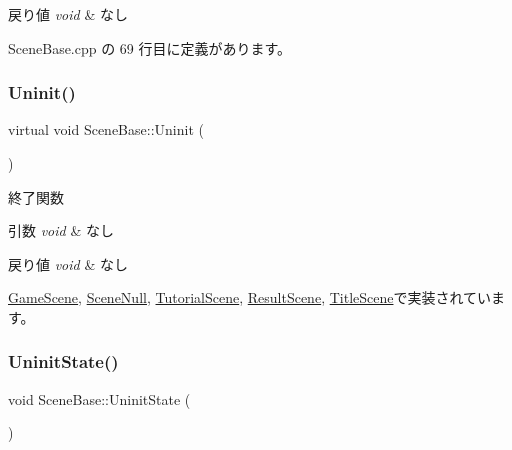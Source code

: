 \begin{DoxyRetVals}{戻り値}
{\em void} & なし \\
\hline
\end{DoxyRetVals}


 Scene\+Base.\+cpp の 69 行目に定義があります。

\mbox{\label{class_scene_base_a175987954480e29219a4e3a1d840bbe4}} 
\subsubsection{\texorpdfstring{Uninit()}{Uninit()}}
{\footnotesize\ttfamily virtual void Scene\+Base\+::\+Uninit (\begin{DoxyParamCaption}{ }\end{DoxyParamCaption})\hspace{0.3cm}{\ttfamily [pure virtual]}}



終了関数 


\begin{DoxyParams}{引数}
{\em void} & なし \\
\hline
\end{DoxyParams}

\begin{DoxyRetVals}{戻り値}
{\em void} & なし \\
\hline
\end{DoxyRetVals}


\mbox{\hyperlink{class_game_scene_a8b96bb5d72109ab37729f05f4f78c43e}{Game\+Scene}}, \mbox{\hyperlink{class_scene_null_abbff54a7323b5ccde4b5094757747738}{Scene\+Null}}, \mbox{\hyperlink{class_tutorial_scene_a988a579b179fc989876b28e24fae7591}{Tutorial\+Scene}}, \mbox{\hyperlink{class_result_scene_a17c396c63a5575a545cd771ece012140}{Result\+Scene}}, \mbox{\hyperlink{class_title_scene_a65fcb66cfab634ff7b0f6b69bbc63d7c}{Title\+Scene}}で実装されています。

\mbox{\label{class_scene_base_a400172870a822dfb7e35a5a046d3ea33}} 
\subsubsection{\texorpdfstring{Uninit\+State()}{UninitState()}}
{\footnotesize\ttfamily void Scene\+Base\+::\+Uninit\+State (\begin{DoxyParamCaption}{ }\end{DoxyParamCaption})\hspace{0.3cm}{\ttfamily [protected]}}



